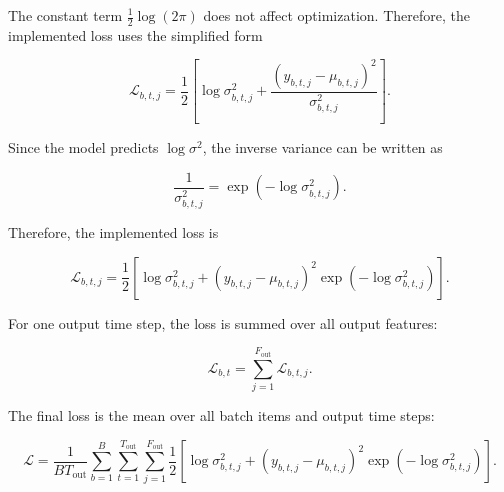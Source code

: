 \documentclass[a4paper]{article}
\begin{document}
        The constant term \(\frac{1}{2}\log(2\pi)\) does not affect optimization. Therefore, the implemented loss uses the simplified form
        
        \[
            \mathcal{L}_{b,t,j}
            =
            \frac{1}{2}
            \left[
                \log \sigma^2_{b,t,j}
                +
                \frac{
                    \left(
                        y_{b,t,j}
                        -
                        \mu_{b,t,j}
                    \right)^2
                }{
                    \sigma^2_{b,t,j}
                }
            \right].
        \]
        
        Since the model predicts \(\log \sigma^2\), the inverse variance can be written as
        
        \[
            \frac{1}{\sigma^2_{b,t,j}}
            =
            \exp
            \left(
                -
                \log \sigma^2_{b,t,j}
            \right).
        \]
        
        Therefore, the implemented loss is
        
        \[
            \mathcal{L}_{b,t,j}
            =
            \frac{1}{2}
            \left[
                \log \sigma^2_{b,t,j}
                +
                \left(
                    y_{b,t,j}
                    -
                    \mu_{b,t,j}
                \right)^2
                \exp
                \left(
                    -
                    \log \sigma^2_{b,t,j}
                \right)
            \right].
        \]
        
        For one output time step, the loss is summed over all output features:
        
        \[
            \mathcal{L}_{b,t}
            =
            \sum_{j=1}^{F_{\mathrm{out}}}
            \mathcal{L}_{b,t,j}.
        \]
        
        The final loss is the mean over all batch items and output time steps:
        
        \[
            \mathcal{L}
            =
            \frac{1}{BT_{\mathrm{out}}}
            \sum_{b=1}^{B}
            \sum_{t=1}^{T_{\mathrm{out}}}
            \sum_{j=1}^{F_{\mathrm{out}}}
            \frac{1}{2}
            \left[
                \log \sigma^2_{b,t,j}
                +
                \left(
                    y_{b,t,j}
                    -
                    \mu_{b,t,j}
                \right)^2
                \exp
                \left(
                    -
                    \log \sigma^2_{b,t,j}
                \right)
            \right].
        \]
    
\end{document}
